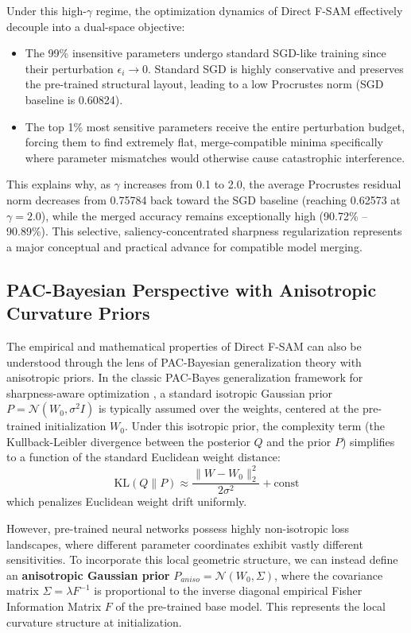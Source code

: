 \documentclass{article}
\theoremstyle{plain}
\theoremstyle{definition}
\theoremstyle{remark}
\begin{document}
Under this high-$\gamma$ regime, the optimization dynamics of Direct F-SAM effectively decouple into a dual-space objective:
\begin{itemize}\setlength{\itemsep}{0pt}\setlength{\parskip}{0pt}\setlength{\parsep}{0pt}
    \item The 99\% insensitive parameters undergo standard SGD-like training since their perturbation $\epsilon_i \to 0$. Standard SGD is highly conservative and preserves the pre-trained structural layout, leading to a low Procrustes norm (SGD baseline is 0.60824).
    \item The top 1\% most sensitive parameters receive the entire perturbation budget, forcing them to find extremely flat, merge-compatible minima specifically where parameter mismatches would otherwise cause catastrophic interference.
\end{itemize}
This explains why, as $\gamma$ increases from 0.1 to 2.0, the average Procrustes residual norm decreases from 0.75784 back toward the SGD baseline (reaching 0.62573 at $\gamma=2.0$), while the merged accuracy remains exceptionally high (90.72\% -- 90.89\%). This selective, saliency-concentrated sharpness regularization represents a major conceptual and practical advance for compatible model merging.

\subsection{PAC-Bayesian Perspective with Anisotropic Curvature Priors}
\label{sec:pac_bayes}

The empirical and mathematical properties of Direct F-SAM can also be understood through the lens of PAC-Bayesian generalization theory with anisotropic priors. In the classic PAC-Bayes generalization framework for sharpness-aware optimization \cite{foret21}, a standard isotropic Gaussian prior $P = \mathcal{N}(W_0, \sigma^2 I)$ is typically assumed over the weights, centered at the pre-trained initialization $W_0$. Under this isotropic prior, the complexity term (the Kullback-Leibler divergence between the posterior $Q$ and the prior $P$) simplifies to a function of the standard Euclidean weight distance:
\begin{equation}
    \text{KL}(Q \parallel P) \approx \frac{\|W - W_0\|_2^2}{2\sigma^2} + \text{const}
\end{equation}
which penalizes Euclidean weight drift uniformly.

However, pre-trained neural networks possess highly non-isotropic loss landscapes, where different parameter coordinates exhibit vastly different sensitivities. To incorporate this local geometric structure, we can instead define an \textbf{anisotropic Gaussian prior} $P_{aniso} = \mathcal{N}(W_0, \Sigma)$, where the covariance matrix $\Sigma = \lambda F^{-1}$ is proportional to the inverse diagonal empirical Fisher Information Matrix $F$ of the pre-trained base model. This represents the local curvature structure at initialization.
\end{document}
